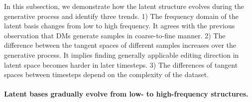 In this subsection, we demonstrate how the latent structure evolves during the generative process and identify three trends. 
1) {The frequency domain of the latent basis changes from low to high frequency. It agrees with the previous observation that DMs generate samples in coarse-to-fine manner.} %
2) The difference between the tangent spaces of different samples increases over the generative process. It implies finding generally applicable editing direction in latent space becomes harder in later timesteps.
3) The differences of tangent spaces {between} timesteps depend on the complexity of the dataset.





\paragraph{{Latent bases gradually evolve from low- to high-frequency structures.}}
\label{sec:evolution-x}




